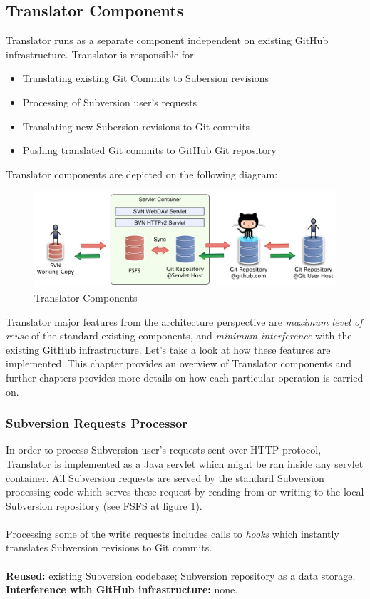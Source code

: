 \subsection{Translator Components}

Translator runs as a separate component independent on existing GitHub infrastructure. Translator is responsible for:
\begin{itemize}
  \item Translating existing Git Commits to Subersion revisions
  \item Processing of Subversion user's requests
  \item Translating new Subersion revisions to Git commits
  \item Pushing translated Git commits to GitHub Git repository
\end{itemize}
Translator components are depicted on the following diagram:
\begin{figure}[!h]
\label{translator_components_pic}
\centering
\includegraphics[width=\linewidth]{img/servlet/components_keep_github_safe.pdf}
\caption{Translator Components}
\end{figure}

Translator major features from the architecture perspective are \emph{maximum level of reuse} of the standard existing components, and \emph{minimum interference} with the existing GitHub infrastructure. 
Let's take a look at how these features are implemented. This chapter provides an overview of Translator components and further chapters provides more details on how each particular operation is carried on.

\label{srp}
\subsubsection{Subversion Requests Processor}
In order to process Subversion user's requests sent over HTTP protocol, Translator is implemented as a Java servlet which might be ran inside any servlet container. All Subversion requests are served by the standard Subversion processing code which serves 
these request by reading from or writing to the local Subversion repository (see FSFS at figure \ref{translator_components_pic}).
\\\\
Processing some of the write requests includes calls to \emph{hooks} which instantly translates Subversion revisions to Git commits.
\\\\
\textbf{Reused:} existing Subversion codebase; Subversion repository as a data storage.\\
\textbf{Interference with GitHub infrastructure:} none. 

